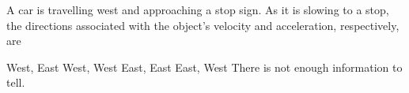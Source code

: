 \documentclass[12pt]{../ossphysics}
\begin{document}
\begin{questions}
%    
%  


  \question A car is travelling west and approaching a stop sign. As it is
  slowing to a stop, the directions associated with the object's velocity and
  acceleration, respectively, are
  \begin{choices}
    \choice West, East
    \choice West, West
    \choice East, East
    \choice East, West
    \choice There is not enough information to tell.
  \end{choices}
  
  

\end{questions}
\end{document}
